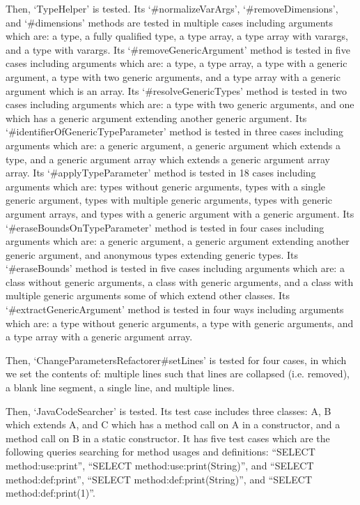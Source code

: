\documentclass[12pt, letterpaper]{article}
\begin{document}
Then, `TypeHelper' is tested.
Its `\#normalizeVarArgs', `\#removeDimensions', and `\#dimensions' methods are tested in multiple cases including arguments which are: a type, a fully qualified type, a type array, a type array with varargs, and a type with varargs.
Its `\#removeGenericArgument' method is tested in five cases including arguments which are: a type, a type array, a type with a generic argument, a type with two generic arguments, and a type array with a generic argument which is an array.
Its `\#resolveGenericTypes' method is tested in two cases including arguments which are: a type with two generic arguments, and one which has a generic argument extending another generic argument.
Its `\#identifierOfGenericTypeParameter' method is tested in three cases including arguments which are: a generic argument, a generic argument which extends a type, and a generic argument array which extends a generic argument array array.
Its `\#applyTypeParameter' method is tested in 18 cases including arguments which are: types without generic arguments, types with a single generic argument, types with multiple generic arguments, types with generic argument arrays, and types with a generic argument with a generic argument.
Its `\#eraseBoundsOnTypeParameter' method is tested in four cases including arguments which are: a generic argument, a generic argument extending another generic argument, and anonymous types extending generic types.
Its `\#eraseBounds' method is tested in five cases including arguments which are: a class without generic arguments, a class with generic arguments, and a class with multiple generic arguments some of which extend other classes.
Its `\#extractGenericArgument' method is tested in four ways including arguments which are: a type without generic arguments, a type with generic arguments, and a type array with a generic argument array.

Then, `ChangeParametersRefactorer\#setLines' is tested for four cases, in which we set the contents of: multiple lines such that lines are collapsed (i.e. removed), a blank line segment, a single line, and multiple lines.

Then, `JavaCodeSearcher' is tested.
Its test case includes three classes: A, B which extends A, and C which has a method call on A in a constructor, and a method call on B in a static constructor.
It has five test cases which are the following queries searching for method usages and definitions: ``SELECT method:use:print'', ``SELECT method:use:print(String)'', and ``SELECT method:def:print'', ``SELECT method:def:print(String)'', and ``SELECT method:def:print(1)''.
\end{document}
